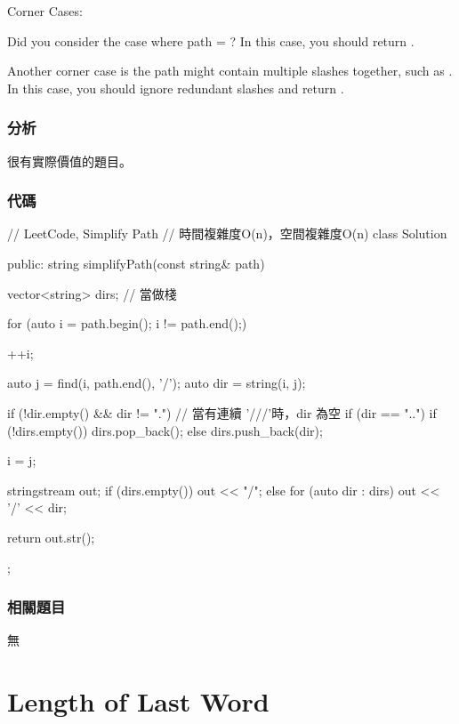 Corner Cases:
\begindot
\item Did you consider the case where path = ? 
In this case, you should return .
\item 
Another corner case is the path might contain multiple slashes  together, such as .
In this case, you should ignore redundant slashes and return .
\myenddot


\subsubsection{分析}
很有實際價值的題目。


\subsubsection{代碼}
\begin{Code}
// LeetCode, Simplify Path
// 時間複雜度O(n)，空間複雜度O(n)
class Solution {
public:
    string simplifyPath(const string& path) {
        vector<string> dirs; // 當做棧

        for (auto i = path.begin(); i != path.end();) {
            ++i;

            auto j = find(i, path.end(), '/');
            auto dir = string(i, j);

            if (!dir.empty() && dir != ".") {// 當有連續 '///'時，dir 為空
                if (dir == "..") {
                    if (!dirs.empty())
                        dirs.pop_back();
                } else
                    dirs.push_back(dir);
            }

            i = j;
        }

        stringstream out;
        if (dirs.empty()) {
            out << "/";
        } else {
            for (auto dir : dirs)
                out << '/' << dir;
        }

        return out.str();
    }
};
\end{Code}


\subsubsection{相關題目}
\begindot
\item 無
\myenddot


\section{Length of Last Word} %
\label{sec:length-of-last-word}


